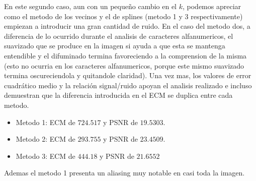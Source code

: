 En este segundo caso, aun con un pequeño cambio en el $k$, podemos apreciar como el metodo de los vecinos y el de splines (metodo 1 y 3 respectivamente) empiezan a introducir una gran cantidad de ruido. En el caso del metodo dos, a diferencia de lo ocurrido durante el analisis de caracteres alfanumericos, el suavizado que se produce en la imagen si ayuda a que esta se mantenga entendible y el difuminado termina favoreciendo a la comprension de la misma (esto no ocurria en los caracteres alfanumericos, porque este mismo suavizado termina oscureciendola y quitandole claridad).
Una vez mas, los valores de error cuadrático medio y la relación signal/ruido apoyan el analisis realizado e incluso demuestran que la diferencia introducida en el ECM se duplica entre cada metodo.

\begin{itemize}
 \item Metodo 1: ECM de $724.517$ y PSNR de $19.5303$.
 \item Metodo 2: ECM de $293.755$ y PSNR de $23.4509$.
 \item Metodo 3: ECM de $444.18$ y PSNR de $21.6552$
\end{itemize}

Ademas el metodo 1 presenta un aliasing muy notable en casi toda la imagen.

